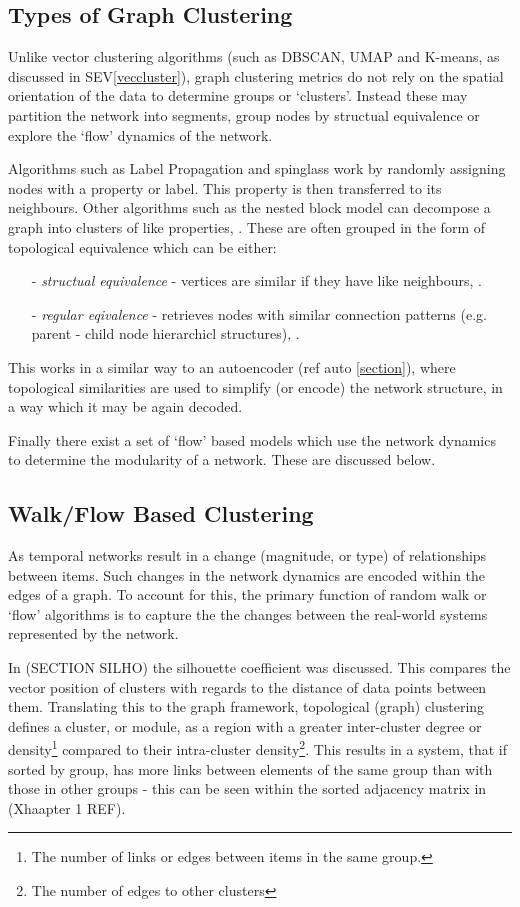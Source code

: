  \subsection{Types of Graph Clustering}
Unlike vector clustering algorithms (such as DBSCAN, UMAP and K-means, as discussed in SEV\autoref{veccluster}), graph clustering metrics do not rely on the spatial orientation of the data to determine groups or `clusters'. Instead these may partition the network into segments, group nodes by structual equivalence or explore the `flow' dynamics of the network. 

Algorithms such as Label Propagation \citep{labelprop} and spinglass \citep{spinglass} work by randomly assigning nodes with a property or label. This property is then transferred to its neighbours. Other algorithms such as the nested block model can decompose a graph into clusters of like properties, \citep{communitygraph}. These are often grouped in the form of topological equivalence which can be either:
\begin{itemize}
    \item[-]\textit{structual equivalence} - vertices are similar if they have like neighbours, \citep{strueq}.
    \item[-]\textit{regular eqivalence} - retrieves nodes with similar connection patterns (e.g. parent - child node hierarchicl structures), \citep{regequiv}. 
\end{itemize}
This works in a similar way to an autoencoder (ref auto \autoref{section}), where topological similarities are used to simplify (or encode) the network structure, in a way which it may be again decoded. 

Finally there exist a set of `flow' based models which use the network dynamics to determine the modularity of a network. These are discussed below. 

\subsection{Walk/Flow Based Clustering}
As temporal networks result in a change (magnitude, or type) of relationships between items. Such changes in the network dynamics are encoded within the edges of a graph. To account for this, the primary function of random walk or `flow' algorithms is to capture the the changes between the real-world systems represented by the network. 

In (SECTION SILHO) the silhouette coefficient was discussed. This compares the vector position of clusters with regards to the distance of data points between them. Translating this to the graph framework, topological (graph) clustering defines a cluster, or module, as a region with a greater inter-cluster degree or density\footnote{The number of links or edges between items in the same group.} compared to their intra-cluster density\footnote{The number of edges to other clusters}. This results in a system, that if sorted by group, has more links between elements of the same group than with those in other groups - this can be seen within the sorted adjacency matrix in (Xhaapter 1 REF). 

